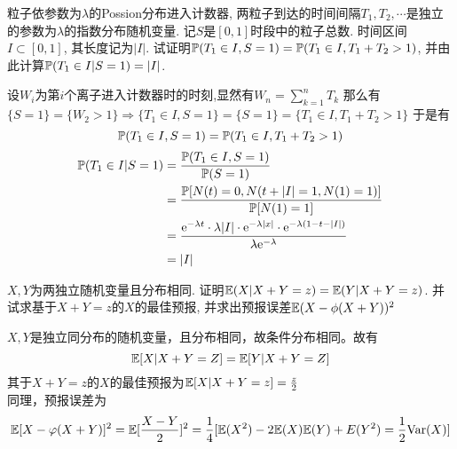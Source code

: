 \begin{problem}{1.10}
粒子依参数为$\lambda $的Possion分布进入计数器, 两粒子到达的时间间隔$T_1, T_2,\cdots $是独立的参数为$\lambda $的指数分布随机变量. 记$S$是$[0,1]$时段中的粒子总数. 时间区间$I\subset [0,1]$, 其长度记为$|I|$. 试证明$\mathbb{P}(T_1\in I, S = 1) = \mathbb{P}(T_1\in I, T_1 + T_2 > 1)$, 并由此计算$\mathbb{P}(T_1\in I|S = 1) = |I|$.
\end{problem}
\begin{solution}
	设$W_i$为第$i$个离子进入计数器时的时刻,显然有$W_n =\sum_{k=1}^{n}T_k$
	那么有$\{S=1\}=\{W_2>1\}\Rightarrow \{T_1\in I,S=1\}=\{S=1\}=\{T_1\in I,T_1+T_2>1\}$
	于是有\[\mathbb{P}(T_1\in I,S=1)=\mathbb{P}(T_1\in I,T_1+T_2>1)\]
	\[\begin{aligned}
			\mathbb{P}(T_1\in I|S=1) & = \frac{\mathbb{P}(T_1\in I,S=1)}{\mathbb{P}(S=1)}                                                                                   \\
			                 & = \frac{\mathbb{P}[N(t)=0, N(t+|I|=1,N(1)=1)]}{\mathbb{P}[N(1)=1]}                                                                   \\
			                 & = \frac{\mathrm{e}^{-\lambda t}\cdot \lambda |I|\cdot \mathrm{e}^{-\lambda |x|}\cdot \mathrm{e}^{-\lambda (1-t-|I|)}}{\lambda \mathrm{e}^{-\lambda}} \\
			                 & = |I|
		\end{aligned}\]
\end{solution}

\begin{problem}{1.11}
$X, Y$为两独立随机变量且分布相同. 证明$\mathbb{E}(X|X+Y = z) = \mathbb{E}(Y|X+Y = z)$. 并试求基于$X+Y=z$的$X$的最佳预报, 并求出预报误差$\mathbb{E}(X-\phi (X+Y))^2$
\end{problem}
\begin{solution}
	$X,Y$是独立同分布的随机变量，且分布相同，故条件分布相同。故有
	\[\mathbb{E}[X|X+Y=Z] = \mathbb{E}[Y|X+Y=Z]\]
	其于$X+Y=z$的$X$的最佳预报为$\mathbb{E}[X|X+Y=z]=\frac{z}{2}$\\
	同理，预报误差为
	\[\mathbb{E}[X-\varphi(X+Y)]^{2} = \mathbb{E}[\frac{X-Y}{2}]^{2} = \frac{1}{4}[\mathbb{E}(X^{2})-2\mathbb{E}(X)\mathbb{E}(Y)+E(Y^{2}) = \frac{1}{2}\mathrm{Var}(X)]\]
\end{solution}

